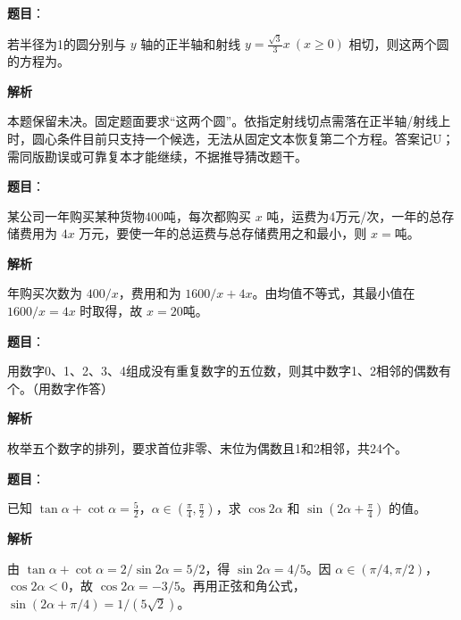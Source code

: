 \begin{answer}

\textbf{题目}：

若半径为1的圆分别与 $y$ 轴的正半轴和射线 $y=\frac{\sqrt3}{3}x\ (x\ge0)$ 相切，则这两个圆的方程为\gkblank{}。

\textbf{解析}

本题保留未决。固定题面要求“这两个圆”。依指定射线切点需落在正半轴/射线上时，圆心条件目前只支持一个候选，无法从固定文本恢复第二个方程。答案记U；需同版勘误或可靠复本才能继续，不据推导猜改题干。


\end{answer}
\begin{answer}

\textbf{题目}：

某公司一年购买某种货物400吨，每次都购买 $x$ 吨，运费为4万元/次，一年的总存储费用为 $4x$ 万元，要使一年的总运费与总存储费用之和最小，则 $x=$\gkblank{}吨。

\textbf{解析}

年购买次数为 $400/x$，费用和为 $1600/x+4x$。由均值不等式，其最小值在 $1600/x=4x$ 时取得，故 $x=20$吨。


\end{answer}
\begin{answer}

\textbf{题目}：

用数字0、1、2、3、4组成没有重复数字的五位数，则其中数字1、2相邻的偶数有\gkblank{}个。（用数字作答）

\textbf{解析}

枚举五个数字的排列，要求首位非零、末位为偶数且1和2相邻，共24个。


\end{answer}
\begin{answer}

\textbf{题目}：

已知 $\tan\alpha+\cot\alpha=\frac52$，$\alpha\in(\frac\pi4,\frac\pi2)$，求 $\cos2\alpha$ 和 $\sin(2\alpha+\frac\pi4)$ 的值。

\textbf{解析}

由 $\tan\alpha+\cot\alpha=2/\sin2\alpha=5/2$，得 $\sin2\alpha=4/5$。因 $\alpha\in(\pi/4,\pi/2)$，$\cos2\alpha<0$，故 $\cos2\alpha=-3/5$。再用正弦和角公式，$\sin(2\alpha+\pi/4)=1/(5\sqrt2)$。


\end{answer}
